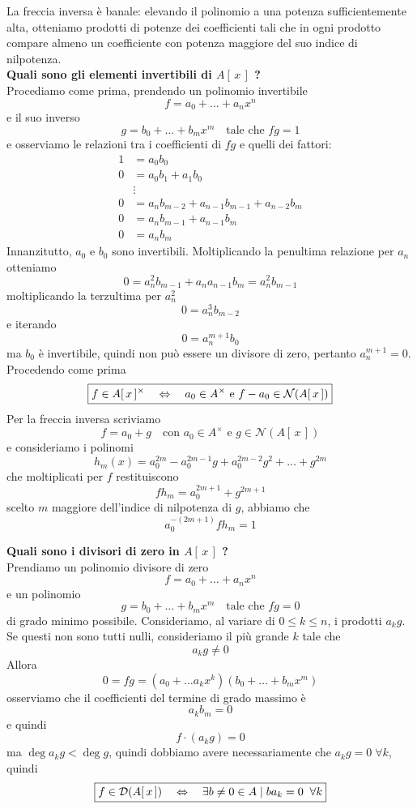 \begin{multicols}{2}
La freccia inversa è banale: elevando il polinomio a una potenza sufficientemente alta, otteniamo prodotti di potenze dei coefficienti tali che in ogni prodotto compare almeno un coefficiente con potenza maggiore del suo indice di nilpotenza. \\

\textbf{Quali sono gli elementi invertibili di $ A[\,x\,] $ ?} \\
Procediamo come prima, prendendo un polinomio invertibile
\[ f = a_0 + \dots + a_nx^n \]
e il suo inverso
\[ g = b_0 + \dots + b_mx^m \quad \text{tale che } fg = 1 \]
e osserviamo le relazioni tra i coefficienti di $ fg $ e quelli dei fattori:
\begin{align*}
	1 & = a_0 b_0 \\
	0 & = a_0 b_1 + a_1b_0 \\
	&  \vdots \\
	0 & = a_nb_{m-2} + a_{n-1}b_{m-1}+ a_{n-2}{b_m}\\
	0 & = a_nb_{m-1} + a_{n-1}b_m \\
	0 & = a_nb_m
\end{align*}
Innanzitutto, $ a_0 $ e $ b_0 $ sono invertibili. Moltiplicando la penultima relazione per $ a_n $ otteniamo
\[ 0 = a_n^2b_{m-1} + a_{n}a_{n-1}b_m = a_n^2b_{m-1} \]
moltiplicando la terzultima per $ a_n^2 $
\[ 0 = a_n^3b_{m-2} \]
e iterando
\[ 0 = a_n^{m+1}b_0 \]
ma $ b_0 $ è invertibile, quindi non può essere un divisore di zero, pertanto $ a_n^{m+1} = 0 $. Procedendo come prima
\[ \boxed{f \in A[\,x\,]^\times \quad\Leftrightarrow\quad a_0 \in A^\times \text{ e } f-a_0 \in \mathcal{N}(A[\,x\,])} \]
Per la freccia inversa scriviamo 
\[ f = a_0 + g \quad \text{con } a_0 \in A^\times \text{ e } g \in \mathcal{N}(A[\,x\,])  \]
e consideriamo i polinomi
\[ h_m(x) = a_0^{2m} - a_0^{2m-1}g + a_0^{2m-2}g^2 + \dots + g^{2m}  \]
che moltiplicati per $ f $ restituiscono
\[ fh_m = a_0^{2m+1} + g^{2m+1}  \]
scelto $ m $ maggiore dell'indice di nilpotenza di $ g $, abbiamo che $$  a_0^{-(2m+1)}f h_{m} = 1  $$

\textbf{Quali sono i divisori di zero in $ A[\,x\,] $ ?} \\
Prendiamo un polinomio divisore di zero
\[ f = a_0 + \dots + a_nx^n \]
e un polinomio 
\[ g = b_0 + \dots + b_mx^m \quad \text{tale che } fg = 0 \]
di grado minimo possibile.
Consideriamo, al variare di $ 0 \leq k \leq n $, i prodotti
 $ a_k g $.
Se questi non sono tutti nulli, consideriamo il più grande $ k $ tale che \[  a_kg \neq 0 \]
Allora
\[ 0 = fg = (a_0 + \dots a_kx^k) (b_0 + \dots + b_mx^m) \]
osserviamo che il coefficienti del termine di grado massimo è
\[ a_kb_m = 0 \]
e quindi
\[ f \cdot (a_k g) = 0 \]
ma $ \deg{a_k g} < \deg{g} $, quindi dobbiamo avere necessariamente che $ a_k g = 0 \;\forall k $, quindi
\[ \boxed{f \in \mathcal{D}(A[\,x\,]) \quad\Leftrightarrow\quad \exists b \neq 0 \in A \mid b a_k = 0 \;\;\forall k} \] 



\end{multicols}
